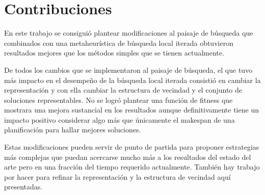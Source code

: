 \section{Contribuciones}
En este trabajo se consiguió plantear modificaciones al paisaje de búsqueda que combinados con una metaheurística de búsqueda local iterada obtuvieron resultados mejores que los métodos simples que se tienen actualmente. 

De todos los cambios que se implementaron al paisaje de búsqueda, el que tuvo más impacto en el desempeño de la búsqueda local iterada consistió en cambiar la representación y con ella cambiar la estructura de vecindad y el conjunto de soluciones representables. No se logró plantear una función de fitness que mostrara una mejora sustancial en los resultados aunque definitivamente tiene un impacto positivo considerar algo más que únicamente el makespan de una planificación para hallar mejores soluciones.

Estas modificaciones pueden servir de punto de partida para proponer estrategias más complejas que puedan acercarse mucho más a los resultados del estado del arte pero en una fracción del tiempo requerido actualmente. También hay trabajo por hacer para refinar la representación y la estructura de vecindad aquí presentadas.


